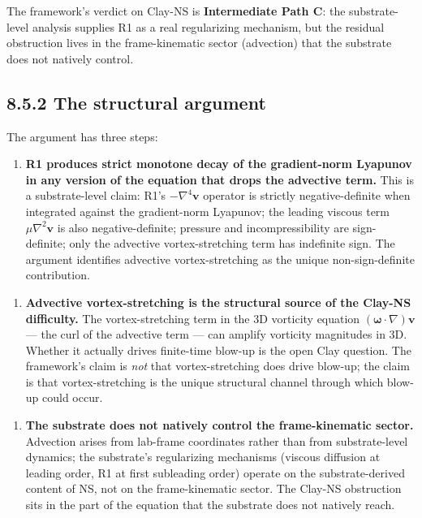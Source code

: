 \documentclass[11pt]{book}
\begin{document}
The framework's verdict on Clay-NS is \textbf{Intermediate Path C}: the substrate-level analysis supplies R1 as a real regularizing mechanism, but the residual obstruction lives in the frame-kinematic sector (advection) that the substrate does not natively control.

\subsection{8.5.2 The structural argument}

The argument has three steps:

\begin{enumerate}
\item \textbf{R1 produces strict monotone decay of the gradient-norm Lyapunov in any version of the equation that drops the advective term.} This is a substrate-level claim: R1's $-\nabla^4\mathbf{v}$ operator is strictly negative-definite when integrated against the gradient-norm Lyapunov; the leading viscous term $\mu\nabla^2\mathbf{v}$ is also negative-definite; pressure and incompressibility are sign-definite; only the advective vortex-stretching term has indefinite sign. The argument identifies advective vortex-stretching as the unique non-sign-definite contribution.
\end{enumerate}

\begin{enumerate}
\item \textbf{Advective vortex-stretching is the structural source of the Clay-NS difficulty.} The vortex-stretching term in the 3D vorticity equation $(\boldsymbol\omega\cdot\nabla)\mathbf{v}$ — the curl of the advective term — can amplify vorticity magnitudes in 3D. Whether it actually drives finite-time blow-up is the open Clay question. The framework's claim is \textit{not} that vortex-stretching does drive blow-up; the claim is that vortex-stretching is the unique structural channel through which blow-up could occur.
\end{enumerate}

\begin{enumerate}
\item \textbf{The substrate does not natively control the frame-kinematic sector.} Advection arises from lab-frame coordinates rather than from substrate-level dynamics; the substrate's regularizing mechanisms (viscous diffusion at leading order, R1 at first subleading order) operate on the substrate-derived content of NS, not on the frame-kinematic sector. The Clay-NS obstruction sits in the part of the equation that the substrate does not natively reach.
\end{enumerate}
\end{document}
